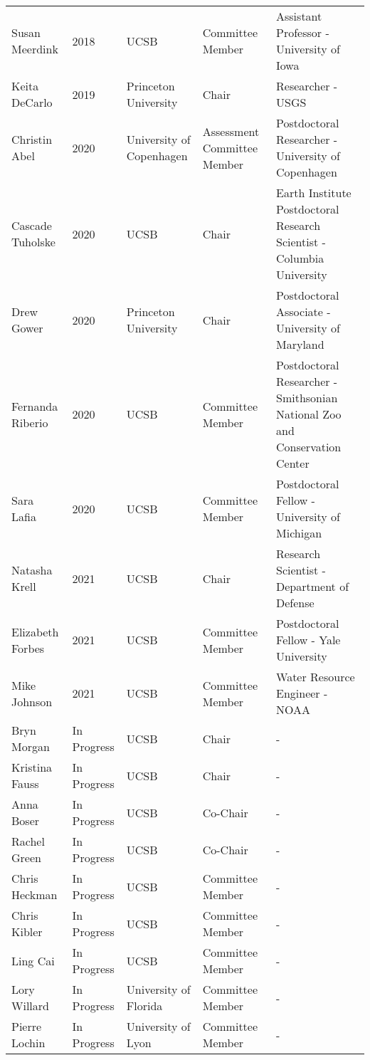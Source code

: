 \begin{longtable}{lp{1.5cm} p{2cm}p{2.5cm}p{6.5cm}}
Susan Meerdink & 2018 & UCSB & Committee Member & Assistant Professor  -  University of Iowa \\
Keita DeCarlo & 2019 & Princeton University & Chair & Researcher  -  USGS \\
Christin Abel & 2020 & University of Copenhagen & Assessment Committee Member & Postdoctoral Researcher  -  University of Copenhagen \\
Cascade Tuholske & 2020 & UCSB & Chair & Earth Institute Postdoctoral Research Scientist  -  Columbia University \\
Drew Gower & 2020 & Princeton University & Chair & Postdoctoral Associate  -  University of Maryland \\
Fernanda Riberio & 2020 & UCSB & Committee Member & Postdoctoral Researcher  -  Smithsonian National Zoo and Conservation Center \\
Sara Lafia & 2020 & UCSB & Committee Member & Postdoctoral Fellow  -  University of Michigan \\
Natasha Krell & 2021 & UCSB & Chair & Research Scientist  -  Department of Defense \\
Elizabeth Forbes & 2021 & UCSB & Committee Member & Postdoctoral Fellow  -  Yale University \\
Mike Johnson & 2021 & UCSB & Committee Member & Water Resource Engineer  -  NOAA \\
Bryn Morgan & In Progress & UCSB & Chair &   -   \\
Kristina Fauss & In Progress & UCSB & Chair &   -   \\
Anna Boser & In Progress & UCSB & Co-Chair &   -   \\
Rachel Green & In Progress & UCSB & Co-Chair &   -   \\
Chris Heckman & In Progress & UCSB & Committee Member &   -   \\
Chris Kibler & In Progress & UCSB & Committee Member &   -   \\
Ling Cai & In Progress & UCSB & Committee Member &   -   \\
Lory Willard & In Progress & University of Florida & Committee Member &   -   \\
Pierre Lochin & In Progress & University of Lyon & Committee Member &   -   \\
\end{longtable}

